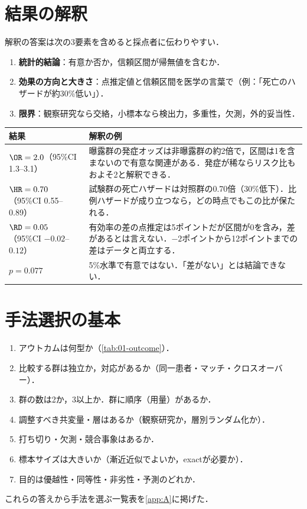 \section{結果の解釈}\label{sec:01-interp}
解釈の答案は次の3要素を含めると採点者に伝わりやすい．
\begin{enumerate}
\item \textbf{統計的結論}：有意か否か，信頼区間が帰無値を含むか．
\item \textbf{効果の方向と大きさ}：点推定値と信頼区間を医学の言葉で（例：「死亡のハザードが約30\%低い」）．
\item \textbf{限界}：観察研究なら交絡，小標本なら検出力，多重性，欠測，外的妥当性．
\end{enumerate}
\begin{center}\small
\begin{tabular}{@{}L{45mm}L{100mm}@{}}
\toprule
結果 & 解釈の例\\
\midrule
$\OR=2.0$（95\%CI 1.3--3.1） & 曝露群の発症オッズは非曝露群の約2倍で，区間は1を含まないので有意な関連がある．発症が稀ならリスク比もおよそ2と解釈できる．\\
$\HR=0.70$（95\%CI 0.55--0.89） & 試験群の死亡ハザードは対照群の0.70倍（30\%低下）．比例ハザードが成り立つなら，どの時点でもこの比が保たれる．\\
$\RD=0.05$（95\%CI $-0.02$--$0.12$） & 有効率の差の点推定は5ポイントだが区間が0を含み，差があるとは言えない．$-2$ポイントから12ポイントまでの差はデータと両立する．\\
$p=0.077$ & 5\%水準で有意ではない．「差がない」とは結論できない．\\
\bottomrule
\end{tabular}
\end{center}

\section{手法選択の基本}\label{sec:01-choice}
\begin{pointbox}[手法選択の質問リスト]
\begin{enumerate}
\item アウトカムは何型か（\cref{tab:01-outcome}）．
\item 比較する群は独立か，対応があるか（同一患者・マッチ・クロスオーバー）．
\item 群の数は2か，3以上か．群に順序（用量）があるか．
\item 調整すべき共変量・層はあるか（観察研究か，層別ランダム化か）．
\item 打ち切り・欠測・競合事象はあるか．
\item 標本サイズは大きいか（漸近近似でよいか，exactが必要か）．
\item 目的は優越性・同等性・非劣性・予測のどれか．
\end{enumerate}
\end{pointbox}
これらの答えから手法を選ぶ一覧表を\cref{app:A}に掲げた．

